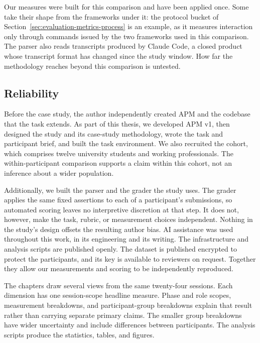 Our measures were built for this comparison and have been applied once. Some take their shape from the frameworks under it: the protocol bucket of Section~\ref{sec:evaluation-metrics-process} is an example, as it measures interaction only through commands issued by the two frameworks used in this comparison. The parser also reads transcripts produced by Claude Code, a closed product whose transcript format has changed since the study window. How far the methodology reaches beyond this comparison is untested.

\subsection{Reliability}

Before the case study, the author independently created APM and the codebase that the task extends. As part of this thesis, we developed APM v1, then designed the study and its case-study methodology, wrote the task and participant brief, and built the task environment. We also recruited the cohort, which comprises twelve university students and working professionals. The within-participant comparison supports a claim within this cohort, not an inference about a wider population.

Additionally, we built the parser and the grader the study uses. The grader applies the same fixed assertions to each of a participant's submissions, so automated scoring leaves no interpretive discretion at that step. It does not, however, make the task, rubric, or measurement choices independent. Nothing in the study's design offsets the resulting author bias. AI assistance was used throughout this work, in its engineering and its writing. The infrastructure and analysis scripts are published openly. The dataset is published encrypted to protect the participants, and its key is available to reviewers on request. Together they allow our measurements and scoring to be independently reproduced.

The chapters draw several views from the same twenty-four sessions. Each dimension has one session-scope headline measure. Phase and role scopes, measurement breakdowns, and participant-group breakdowns explain that result rather than carrying separate primary claims. The smaller group breakdowns have wider uncertainty and include differences between participants. The analysis scripts produce the statistics, tables, and figures.
